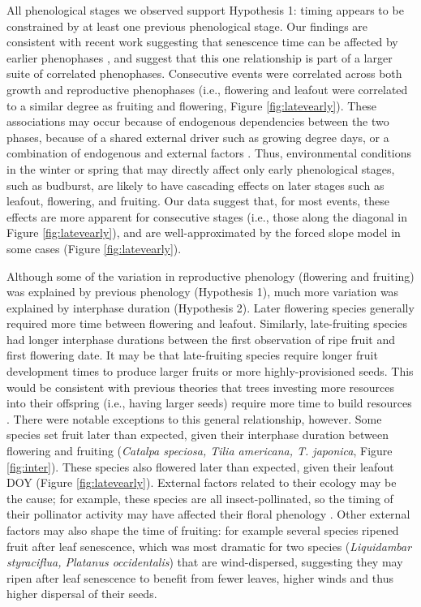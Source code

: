 \documentclass{article}
\begin{document}
\par All phenological stages we observed support Hypothesis 1: timing appears to be constrained by at least one previous phenological stage. Our findings are consistent with recent work suggesting that senescence time can be affected by earlier phenophases \citep{keenan2015,liu2016,li2016}, and suggest that this one relationship is part of a larger suite of correlated phenophases. Consecutive events were correlated across both growth and reproductive phenophases (i.e., flowering and leafout were correlated to a similar degree as fruiting and flowering, Figure \ref{fig:latevearly}). These associations may occur because of endogenous dependencies between the two phases, because of a shared external driver such as growing degree days, or a combination of endogenous and external factors \citep{lechowicz1995}. Thus, environmental conditions in the winter or spring that may directly affect only early phenological stages, such as budburst, are likely to have cascading effects on later stages such as leafout, flowering, and fruiting. Our data suggest that, for most events, these effects are more apparent for consecutive stages (i.e., those along the diagonal in Figure \ref{fig:latevearly}), and are well-approximated by the forced slope model in some cases (Figure \ref{fig:latevearly}).

\par Although some of the variation in reproductive phenology (flowering and fruiting) was explained by previous phenology (Hypothesis 1), much more variation was explained by interphase duration (Hypothesis 2). Later flowering species generally required more time between flowering and leafout. Similarly, late-fruiting species had longer interphase durations between the first observation of ripe fruit and first flowering date. It may be that late-fruiting species require longer fruit development times to produce larger fruits or more highly-provisioned seeds. This would be consistent with previous theories that trees investing more resources into their offspring (i.e., having larger seeds) require more time to build resources \citep{bolmgren2008,sun2011}. There were notable exceptions to this general relationship, however. Some species set fruit later than expected, given their interphase duration between flowering and fruiting (\textit{Catalpa speciosa, Tilia americana, T. japonica}, Figure \ref{fig:inter}). These species also flowered later than expected, given their leafout DOY (Figure \ref{fig:latevearly}). External factors related to their ecology may be the cause; for example, these species are all insect-pollinated, so the timing of their pollinator activity may have affected their floral phenology \citep{elzinga2007}. Other external factors may also shape the time of fruiting: for example several species ripened fruit after leaf senescence, which was most dramatic for two species (\emph{Liquidambar styraciflua, Platanus occidentalis}) that are wind-dispersed, suggesting they may ripen after leaf senescence to benefit from fewer leaves, higher winds and thus higher dispersal of their seeds.
\end{document}
